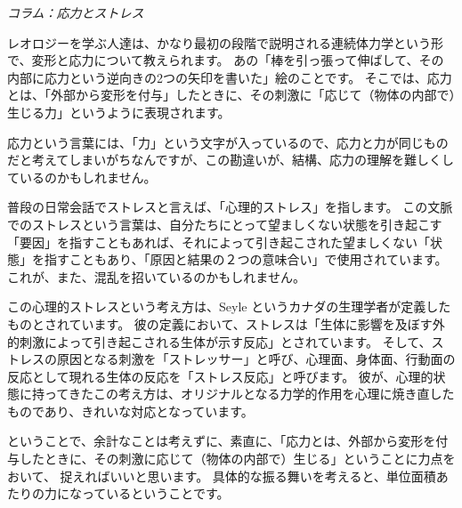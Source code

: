 \documentclass[uplatex,dvipdfmx,a4paper,11pt]{jsarticle}
\begin{document}
\begin{longartdeco}
	\begin{center}
	\emph{コラム：応力とストレス}	
	\end{center}

	レオロジーを学ぶ人達は、かなり最初の段階で説明される連続体力学という形で、変形と応力について教えられます。
	あの「棒を引っ張って伸ばして、その内部に応力という逆向きの2つの矢印を書いた」絵のことです。
	そこでは、応力とは、「外部から変形を付与」したときに、その刺激に「応じて（物体の内部で）生じる力」というように表現されます。
	
	応力という言葉には、「力」という文字が入っているので、応力と力が同じものだと考えてしまいがちなんですが、この勘違いが、結構、応力の理解を難しくしているのかもしれません。
	
	普段の日常会話でストレスと言えば、「心理的ストレス」を指します。
	この文脈でのストレスという言葉は、自分たちにとって望ましくない状態を引き起こす「要因」を指すこともあれば、それによって引き起こされた望ましくない「状態」を指すこともあり、「原因と結果の２つの意味合い」で使用されています。
	これが、また、混乱を招いているのかもしれません。
	
	この心理的ストレスという考え方は、Seyle というカナダの生理学者が定義したものとされています。
	彼の定義において、ストレスは「生体に影響を及ぼす外的刺激によって引き起こされる生体が示す反応」とされています。
	そして、ストレスの原因となる刺激を「ストレッサー」と呼び、心理面、身体面、行動面の反応として現れる生体の反応を「ストレス反応」と呼びます。
	彼が、心理的状態に持ってきたこの考え方は、オリジナルとなる力学的作用を心理に焼き直したものであり、きれいな対応となっています。
	
	ということで、余計なことは考えずに、素直に、「応力とは、外部から変形を付与したときに、その刺激に応じて（物体の内部で）生じる」ということに力点をおいて、
捉えればいいと思います。
具体的な振る舞いを考えると、単位面積あたりの力になっているということです。
	
\end{longartdeco}
\end{document}
